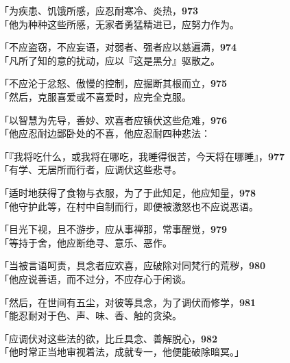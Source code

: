 「为疾患、饥饿所感，应忍耐寒冷、炎热，\hfill{\grayfootnotesize \textbf{973}} \\
「他为种种这些所感，无家者勇猛精进已，应努力作为。


「不应盗窃，不应妄语，对弱者、强者应以慈遍满，\hfill{\grayfootnotesize \textbf{974}} \\
「凡所了知的意的扰动，应以『这是黑分』驱散之。


「不应沦于忿怒、傲慢的控制，应掘断其根而立，\hfill{\grayfootnotesize \textbf{975}} \\
「然后，克服喜爱或不喜爱时，应完全克服。


「以智慧为先导，善妙、欢喜者应镇伏这些危难，\hfill{\grayfootnotesize \textbf{976}} \\
「他应忍耐边鄙卧处的不喜，他应忍耐四种悲法：


「『我将吃什么，或我将在哪吃，我睡得很苦，今天将在哪睡』，\hfill{\grayfootnotesize \textbf{977}} \\
「有学、无居所而行者，应调伏这些悲寻。


「适时地获得了食物与衣服，为了于此知足，他应知量，\hfill{\grayfootnotesize \textbf{978}} \\
「他守护此等，在村中自制而行，即便被激怒也不应说恶语。


「目光下视，且不游步，应从事禅那，常事醒觉，\hfill{\grayfootnotesize \textbf{979}} \\
「等持于舍，他应断绝寻、意乐、恶作。


「当被言语呵责，具念者应欢喜，应破除对同梵行的荒秽，\hfill{\grayfootnotesize \textbf{980}} \\
「他应说善语，而不过分，不应存心于闲谈。


「然后，在世间有五尘，对彼等具念，为了调伏而修学，\hfill{\grayfootnotesize \textbf{981}} \\
「能忍耐对于色、声、味、香、触的贪染。


「应调伏对这些法的欲，比丘具念、善解脱心，\hfill{\grayfootnotesize \textbf{982}} \\
「他时常正当地审视着法，成就专一，他便能破除暗冥。」
